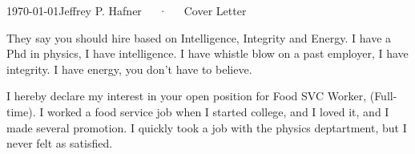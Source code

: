 \documentclass[11pt, a4paper]{awesome-cv}
\begin{document}
\makecvheader[R]

\makecvfooter
  {\today}{Jeffrey P. Hafner~~~·~~~Cover Letter}{}

\makelettertitle

\begin{cvletter}

They say you should hire based on Intelligence, Integrity and Energy.
I have a Phd in physics, I have intelligence.
I have whistle blow on a past employer, I have integrity.
I have energy, you don't have to believe.


I hereby declare my interest in your open position for Food SVC Worker, (Full-time).
I worked a food service job when I started college, and I loved it, and I made several promotion.
I quickly took a job with the physics deptartment, but I never felt as satisfied.








%

\end{cvletter}


\makeletterclosing

\end{document}
